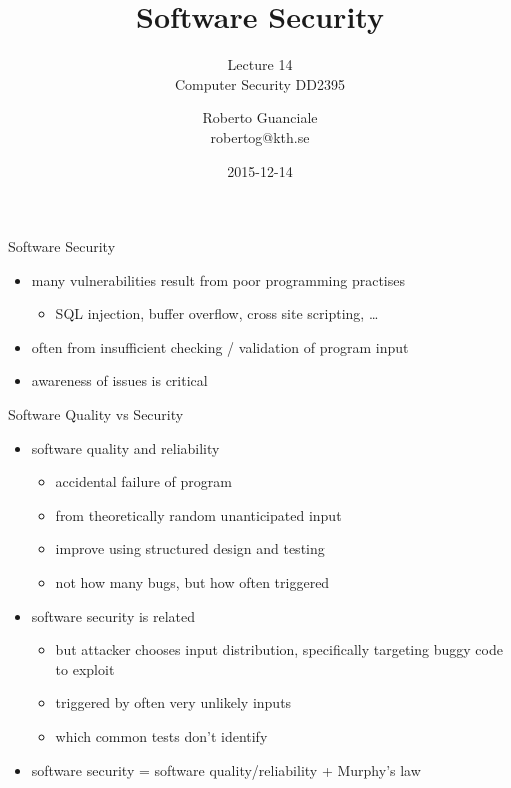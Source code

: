 \documentclass{beamer}
\title{Software Security}
\subtitle{Lecture 14 \\ Computer Security DD2395}
\author[R. Guanciale]{
  Roberto Guanciale\\
  robertog@kth.se
}
\date{2015-12-14}
\begin{document}
\begin{frame}[plain]
  \titlepage
\end{frame}

\begin{frame}{Software Security}
  \begin{itemize}
    \item many vulnerabilities result from poor programming practises 
      \begin{itemize}
        \item SQL injection, buffer overflow, cross site scripting, \dots
      \end{itemize}
    \item often from insufficient checking / validation of
      program input 
    \item awareness of issues is critical 
  \end{itemize}
\end{frame}


\begin{frame}{Software Quality vs Security}
  \begin{itemize}
  \item software quality and reliability
    \begin{itemize}
    \item accidental failure of program
    \item from theoretically random unanticipated input
    \item improve using structured design and testing
    \item not how many bugs, but how often triggered
    \end{itemize}
  \item software security is related
    \begin{itemize}
    \item but attacker chooses input distribution, specifically
      targeting buggy code to exploit
    \item triggered by often very unlikely inputs
    \item which common tests don’t identify
    \end{itemize}
  \item software security = software quality/reliability + Murphy's law
  \end{itemize}
\end{frame}
\end{document}

